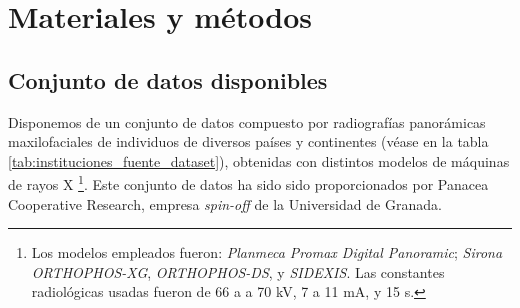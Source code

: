 \chapter{Materiales y métodos} 


\section{Conjunto de datos disponibles}

Disponemos de un conjunto de datos compuesto por radiografías panorámicas maxilofaciales de individuos de 
diversos países y continentes (véase en la tabla \ref{tab:instituciones_fuente_dataset}), obtenidas con
distintos modelos de máquinas de rayos X
\footnote{
    Los modelos empleados fueron: \textit{Planmeca Promax Digital Panoramic}; \textit{Sirona ORTHOPHOS-XG}, 
    \textit{ORTHOPHOS-DS}, y \textit{SIDEXIS}. Las constantes radiológicas usadas fueron de 66 a a 70 kV, 7 a 
    11 mA, y 15 s.
}.
Este conjunto de datos ha sido sido proporcionados por Panacea Cooperative Research, empresa \textit{spin-off} 
de la Universidad de Granada.  

